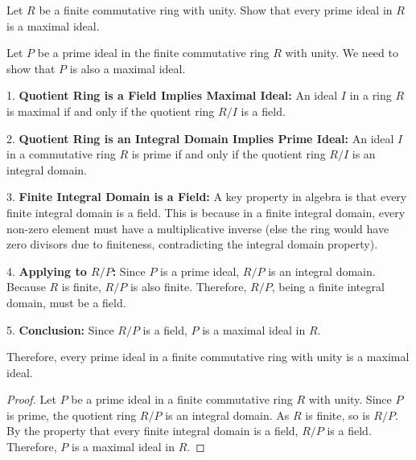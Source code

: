 \documentclass[12pt]{amsart}
\theoremstyle{definition}
\numberwithin{equation}{section}
\theoremstyle{plain}
\begin{document}
\begin{exercise}{24} Let $R$ be a finite commutative ring with unity. Show that every prime ideal in $R$ is a maximal ideal.

Let \( P \) be a prime ideal in the finite commutative ring \( R \) with unity. We need to show that \( P \) is also a maximal ideal.

1. \textbf{Quotient Ring is a Field Implies Maximal Ideal:} An ideal \( I \) in a ring \( R \) is maximal if and only if the quotient ring \( R/I \) is a field.

2. \textbf{Quotient Ring is an Integral Domain Implies Prime Ideal:} An ideal \( I \) in a commutative ring \( R \) is prime if and only if the quotient ring \( R/I \) is an integral domain.

3. \textbf{Finite Integral Domain is a Field:} A key property in algebra is that every finite integral domain is a field. This is because in a finite integral domain, every non-zero element must have a multiplicative inverse (else the ring would have zero divisors due to finiteness, contradicting the integral domain property).

4. \textbf{Applying to \( R/P \):} Since \( P \) is a prime ideal, \( R/P \) is an integral domain. Because \( R \) is finite, \( R/P \) is also finite. Therefore, \( R/P \), being a finite integral domain, must be a field.

5. \textbf{Conclusion:} Since \( R/P \) is a field, \( P \) is a maximal ideal in \( R \).

Therefore, every prime ideal in a finite commutative ring with unity is a maximal ideal.

\begin{proof}
Let \( P \) be a prime ideal in a finite commutative ring \( R \) with unity. Since \( P \) is prime, the quotient ring \( R/P \) is an integral domain. As \( R \) is finite, so is \( R/P \). By the property that every finite integral domain is a field, \( R/P \) is a field. Therefore, \( P \) is a maximal ideal in \( R \).
\end{proof}
\end{exercise}
    
\end{document}
